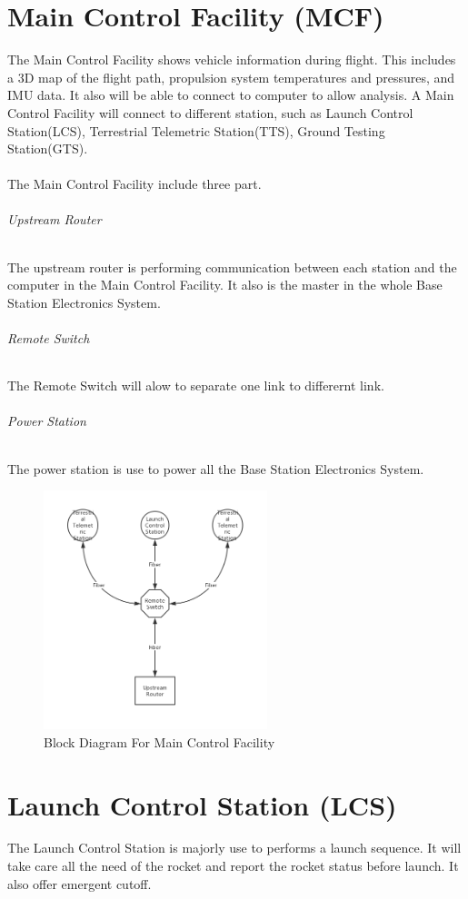 \documentclass[12pt,article]{memoir}
\begin{document}
\chapter{Main Control Facility (MCF)}
The Main Control Facility shows vehicle information during flight. This includes a 3D map of the flight path, propulsion system temperatures and pressures, and IMU data. It also will be able to connect to computer to allow analysis. A Main Control Facility will connect to different station, such as  Launch Control Station(LCS), Terrestrial Telemetric Station(TTS), Ground Testing Station(GTS).\\\\
The Main Control Facility include three part.
\subparagraph{Upstream Router}
The upstream router is performing communication between each station and the computer in the Main Control Facility. It also is the master in the whole Base Station Electronics System.
\subparagraph{Remote Switch}
The Remote Switch will alow to separate one link to differernt link.
\subparagraph{Power Station} The power station is use to power all the Base Station Electronics System.
\\
\begin{figure}[htp]
\begin{center}
\includegraphics[width=0.58\textwidth]{img/ES00004_MCF.png}
 \caption{Block Diagram For Main Control Facility}	
\end{center}
\end{figure}
\newpage
\chapter{Launch Control Station (LCS)}
The Launch Control Station is majorly use to performs a launch sequence. It will take care all the need of the rocket and report the rocket status before launch. It also offer emergent cutoff. 
\newpage
\end{document}
